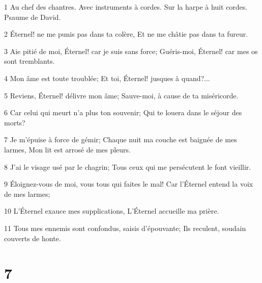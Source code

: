 \par 1 Au chef des chantres. Avec instruments à cordes. Sur la harpe à huit cordes. Psaume de David.
\par 2 Éternel! ne me punis pas dans ta colère, Et ne me châtie pas dans ta fureur.
\par 3 Aie pitié de moi, Éternel! car je suis sans force; Guéris-moi, Éternel! car mes os sont tremblants.
\par 4 Mon âme est toute troublée; Et toi, Éternel! jusques à quand?...
\par 5 Reviens, Éternel! délivre mon âme; Sauve-moi, à cause de ta miséricorde.
\par 6 Car celui qui meurt n'a plus ton souvenir; Qui te louera dans le séjour des morts?
\par 7 Je m'épuise à force de gémir; Chaque nuit ma couche est baignée de mes larmes, Mon lit est arrosé de mes pleurs.
\par 8 J'ai le visage usé par le chagrin; Tous ceux qui me persécutent le font vieillir.
\par 9 Éloignez-vous de moi, vous tous qui faites le mal! Car l'Éternel entend la voix de mes larmes;
\par 10 L'Éternel exauce mes supplications, L'Éternel accueille ma prière.
\par 11 Tous mes ennemis sont confondus, saisis d'épouvante; Ils reculent, soudain couverts de honte.

\chapter{7}

